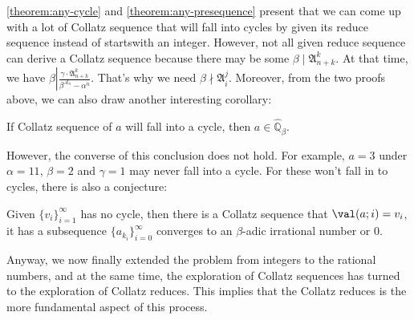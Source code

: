 \cref{theorem:any-cycle} and \cref{theorem:any-presequence} present that we can come up with a lot of Collatz sequence that will fall into cycles by given its reduce sequence instead of startswith an integer.
However, not all given reduce sequence can derive a Collatz sequence because there may be some $\beta\mid \mathfrak{A}_{n+k}^{k}$.
At that time, we have $\beta \left\vert \frac{\gamma\cdot\mathfrak{A}_{n+k}^{k}}{\beta^{\mathcal{A}_n} - \alpha^n} \right.$.
That's why we need $\beta \nmid \mathfrak{A}_i^j$.
Moreover, from the two proofs above, we can also draw another interesting corollary:
\begin{theorem}
    If Collatz sequence of $a$ will fall into a cycle, then $a \in \widehat{\mathbb{Q}}_{{\beta}}$.
\end{theorem}
However, the converse of this conclusion does not hold.
For example, $a=3$ under $\alpha = 11$, $\beta=2$ and $\gamma=1$ may never fall into a cycle.
For these won't fall in to cycles, there is also a conjecture:
\begin{conjecture}
    Given $\{v_{i}\}_{i=1}^{\infty}$ has no cycle, then there is a Collatz sequence that $\val(a;i) = v_{i}$, it has a subsequence $\{a_{k_i}\}_{i=0}^{\infty}$ converges to an $\beta$-adic irrational number or $0$.
\end{conjecture}

Anyway, we now finally extended the problem from integers to the rational numbers, and at the same time, the exploration of Collatz sequences has turned to the exploration of Collatz reduces.
This implies that the Collatz reduces is the more fundamental aspect of this process.
